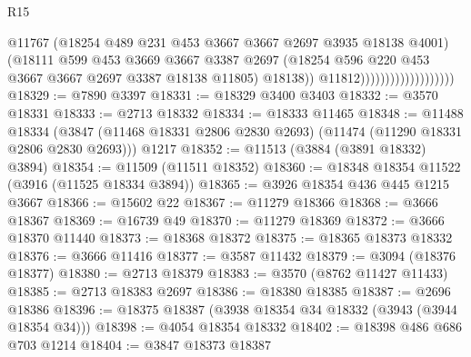 \begin{lexlean}{R15}
\begin{coremodule}
                                            @11767
                                            (@18254
                                              @489
                                              @231
                                              @453
                                              @3667
                                              @3667
                                              @2697
                                              @3935
                                              @18138
                                              @4001)
                                            (@18111
                                              @599
                                              @453
                                              @3669
                                              @3667
                                              @3387
                                              @2697
                                              (@18254
                                                @596
                                                @220
                                                @453
                                                @3667
                                                @3667
                                                @2697
                                                @3387
                                                @18138
                                                @11805)
                                              @18138))
                                          @11812)))))))))))))))))))
@18329 := @7890 @3397
@18331 := @18329 @3400 @3403
@18332 := @3570 @18331
@18333 := @2713 @18332
@18334 := @18333 @11465
@18348 := @11488
    @18334
    (@3847 (@11468 @18331 @2806 @2830 @2693) (@11474 (@11290 @18331 @2806 @2830 @2693)))
    @1217
@18352 := @11513 (@3884 (@3891 @18332) @3894)
@18354 := @11509 (@11511 @18352)
@18360 := @18348 @18354 @11522 (@3916 (@11525 @18334 @3894))
@18365 := @3926 @18354 @436 @445 @1215 @3667
@18366 := @15602 @22
@18367 := @11279 @18366
@18368 := @3666 @18367
@18369 := @16739 @49
@18370 := @11279 @18369
@18372 := @3666 @18370 @11440
@18373 := @18368 @18372
@18375 := @18365 @18373 @18332
@18376 := @3666 @11416
@18377 := @3587 @11432
@18379 := @3094 (@18376 @18377)
@18380 := @2713 @18379
@18383 := @3570 (@8762 @11427 @11433)
@18385 := @2713 @18383 @2697
@18386 := @18380 @18385
@18387 := @2696 @18386
@18396 := @18375 @18387 (@3938 @18354 @34 @18332 (@3943 (@3944 @18354 @34)))
@18398 := @4054 @18354 @18332
@18402 := @18398 @486 @686 @703 @1214
@18404 := @3847 @18373 @18387

\end{coremodule}
\end{lexlean}
